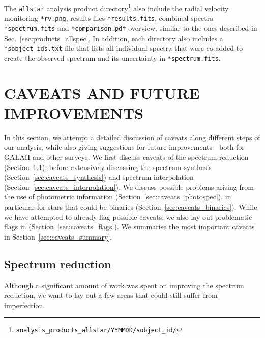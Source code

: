 \documentclass[
  journal=pasa,
  manuscript=research-paper, %
  year=2024,
  volume=37
]{cup-journal}
\begin{document}
The \texttt{allstar} analysis product directory\footnote{\texttt{analysis\_products\_allstar/YYMMDD/sobject\_id/}} also include the radial velocity monitoring \texttt{*rv.png}, results files  \texttt{*results.fits}, combined spectra \texttt{*spectrum.fits} and \texttt{*comparison.pdf} overview, similar to the ones described in Sec.~\ref{sec:products_allspec}. In addition, each directory also includes a \texttt{*sobject\_ids.txt} file that lists all individual spectra that were co-added to create the observed spectrum and its uncertainty in \texttt{*spectrum.fits}.


\section{CAVEATS AND FUTURE IMPROVEMENTS} \label{sec:caveats}

In this section, we attempt a detailed discussion of caveats along different steps of our analysis, while also giving suggestions for future improvements - both for GALAH and other surveys. We first discuss caveats of the spectrum reduction (Section~\ref{sec:caveats_reduction}), before extensively discussing the spectrum synthesis (Section~\ref{sec:caveats_synthesis}) and spectrum interpolation (Section~\ref{sec:caveats_interpolation}). We discuss possible problems arising from the use of photometric information (Section~\ref{sec:caveats_photospec}), in particular for stars that could be binaries (Section~\ref{sec:caveats_binaries}). While we have attempted to already flag possible caveats, we also lay out problematic flags in (Section~\ref{sec:caveats_flags}). We summarise the most important caveats in Section~\ref{sec:caveats_summary}.

\subsection{Spectrum reduction}  \label{sec:caveats_reduction}

Although a significant amount of work was spent on improving the spectrum reduction, we want to lay out a few areas that could still suffer from imperfection.
\end{document}
